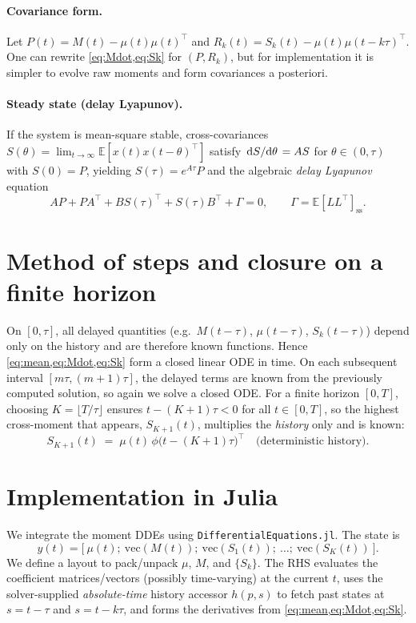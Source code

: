 \documentclass[11pt]{article}
\begin{document}
\paragraph{Covariance form.}
Let $P(t)=M(t)-\mu(t)\mu(t)^\top$ and $R_k(t)=S_k(t)-\mu(t)\mu(t-k\tau)^\top$. One can rewrite \eqref{eq:Mdot,eq:Sk} for $(P,R_k)$, but for implementation it is simpler to evolve raw moments and form covariances a posteriori.

\paragraph{Steady state (delay Lyapunov).}
If the system is mean-square stable, cross-covariances $S(\theta)=\lim_{t\to\infty}\mathbb{E}[x(t)x(t-\theta)^\top]$ satisfy $\dv*{S}{\theta}=A S$ for $\theta\in(0,\tau)$ with $S(0)=P$, yielding $S(\tau)=e^{A\tau}P$ and the algebraic \emph{delay Lyapunov} equation
\begin{equation}
  A P + P A^\top + B S(\tau)^\top + S(\tau) B^\top + \Gamma = 0,\qquad \Gamma=\mathbb{E}[L L^\top]_{\text{ss}}.
\end{equation}

\section{Method of steps and closure on a finite horizon}
On $[0,\tau]$, all delayed quantities (e.g.\ $M(t-\tau)$, $\mu(t-\tau)$, $S_k(t-\tau)$) depend only on the history and are therefore known functions. Hence \eqref{eq:mean,eq:Mdot,eq:Sk} form a closed linear ODE in time. On each subsequent interval $[m\tau,(m+1)\tau]$, the delayed terms are known from the previously computed solution, so again we solve a closed ODE. For a finite horizon $[0,T]$, choosing $K=\lfloor T/\tau\rfloor$ ensures $t-(K+1)\tau<0$ for all $t\in[0,T]$, so the highest cross-moment that appears, $S_{K+1}(t)$, multiplies the \emph{history} only and is known:
\begin{equation}
  S_{K+1}(t) \;=\; \mu(t)\,\phi\!\big(t-(K+1)\tau\big)^\top \quad\text{(deterministic history)}.
\end{equation}

\section{Implementation in Julia}
We integrate the moment DDEs using \texttt{DifferentialEquations.jl}. The state is
\begin{equation*}
  y(t) = \big[\ \mu(t);\ \mathrm{vec}(M(t));\ \mathrm{vec}(S_1(t));\ \dots;\ \mathrm{vec}(S_K(t))\ \big].
\end{equation*}
We define a layout to pack/unpack $\mu$, $M$, and $\{S_k\}$. The RHS evaluates the coefficient matrices/vectors (possibly time-varying) at the current $t$, uses the solver-supplied \emph{absolute-time} history accessor $h(p,s)$ to fetch past states at $s=t-\tau$ and $s=t-k\tau$, and forms the derivatives from \eqref{eq:mean,eq:Mdot,eq:Sk}.
\end{document}

